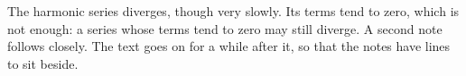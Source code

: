 The harmonic series diverges, though very slowly. Its terms tend to zero, which is not enough: a series
whose terms tend to zero may still diverge. A second note follows
closely. The text goes on for
a while after it, so that the notes have lines to sit beside.
